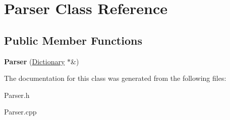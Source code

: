\hypertarget{classParser}{\section{Parser Class Reference}
\label{classParser}
}
\subsection*{Public Member Functions}
\begin{DoxyCompactItemize}
\item 
\hypertarget{classParser_ac910dcda772ee8ed3c271cd7f8bfd21e}{{\bfseries Parser} (\hyperlink{classDictionary}{Dictionary} $\ast$\&)}\label{classParser_ac910dcda772ee8ed3c271cd7f8bfd21e}

\end{DoxyCompactItemize}


The documentation for this class was generated from the following files\-:\begin{DoxyCompactItemize}
\item 
Parser.\-h\item 
Parser.\-cpp\end{DoxyCompactItemize}
